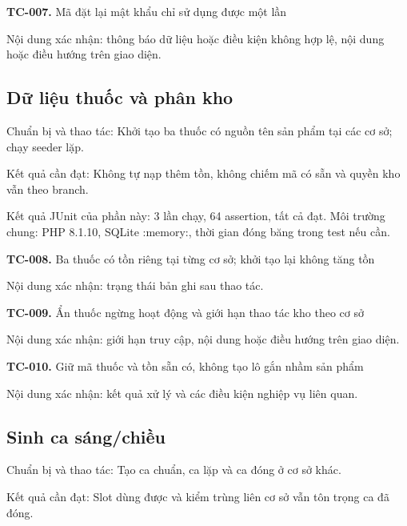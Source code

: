 \noindent\textbf{TC-007.} Mã đặt lại mật khẩu chỉ sử dụng được một lần\par
Nội dung xác nhận:\allowbreak{} thông báo dữ liệu hoặc điều kiện không hợp lệ, nội dung hoặc điều hướng trên giao diện.\allowbreak{}


\par\vspace{8pt}

\subsection{Dữ liệu thuốc và phân kho}
Chuẩn bị và thao tác:\allowbreak{} Khởi tạo ba thuốc có nguồn tên sản phẩm tại các cơ sở; chạy seeder lặp.\allowbreak{}

Kết quả cần đạt:\allowbreak{} Không tự nạp thêm tồn, không chiếm mã có sẵn và quyền kho vẫn theo branch.\allowbreak{}

Kết quả JUnit của phần này:\allowbreak{} 3 lần chạy, 64 assertion, tất cả đạt.\allowbreak{} Môi trường chung:\allowbreak{} PHP 8.\allowbreak{}1.\allowbreak{}10, SQLite :\allowbreak{}memory:\allowbreak{}, thời gian đóng băng trong test nếu cần.\allowbreak{}

\noindent\textbf{TC-008.} Ba thuốc có tồn riêng tại từng cơ sở; khởi tạo lại không tăng tồn\par
Nội dung xác nhận:\allowbreak{} trạng thái bản ghi sau thao tác.\allowbreak{}

\noindent\textbf{TC-009.} Ẩn thuốc ngừng hoạt động và giới hạn thao tác kho theo cơ sở\par
Nội dung xác nhận:\allowbreak{} giới hạn truy cập, nội dung hoặc điều hướng trên giao diện.\allowbreak{}

\noindent\textbf{TC-010.} Giữ mã thuốc và tồn sẵn có, không tạo lô gắn nhầm sản phẩm\par
Nội dung xác nhận:\allowbreak{} kết quả xử lý và các điều kiện nghiệp vụ liên quan.\allowbreak{}


\par\vspace{8pt}

\subsection{Sinh ca sáng/\allowbreak{}chiều}
Chuẩn bị và thao tác:\allowbreak{} Tạo ca chuẩn, ca lặp và ca đóng ở cơ sở khác.\allowbreak{}

Kết quả cần đạt:\allowbreak{} Slot dùng được và kiểm trùng liên cơ sở vẫn tôn trọng ca đã đóng.\allowbreak{}

